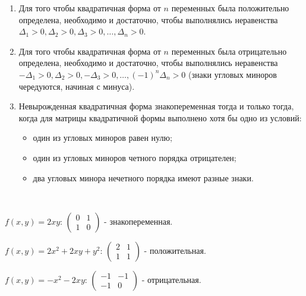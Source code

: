 \begin{enumerate}
    \item Для того чтобы квадратичная форма от $n$ переменных была положительно определена, необходимо и достаточно, чтобы выполнялись неравенства $\Delta_1 > 0, \Delta_2 > 0, \Delta_3 > 0, \ldots, \Delta_n > 0$.
    \item Для того чтобы квадратичная форма от $n$ переменных была отрицательно определена, необходимо и достаточно, чтобы выполнялись неравенства $-\Delta_1 > 0, \Delta_2 > 0, -\Delta_3 > 0, \ldots, (-1)^n\Delta_n > 0$ (знаки угловых миноров чередуются, начиная с минуса).
    \item Невырожденная квадратичная форма знакопеременная тогда и только тогда, когда для матрицы квадратичной формы выполнено хотя бы одно из условий:
    \begin{itemize}
        \item один из угловых миноров равен нулю;
        \item один из угловых миноров четного порядка отрицателен;
        \item два угловых минора нечетного порядка имеют разные знаки.
    \end{itemize}
\end{enumerate}

\begin{example}~

    $f(x, y) = 2xy$: $\left(\begin{array}{cc}
        0 & 1 \\
        1 & 0
    \end{array}\right)$ - знакопеременная.

    $f(x, y) = 2x^2 + 2xy + y^2$: $\left(\begin{array}{cc}
        2 & 1 \\
        1 & 1
    \end{array}\right)$ - положительная.

    $f(x, y) = -x^2 - 2xy$: $\left(\begin{array}{cc}
        -1 & -1 \\
        -1 & 0
    \end{array}\right)$ - отрицательная.
\end{example}
